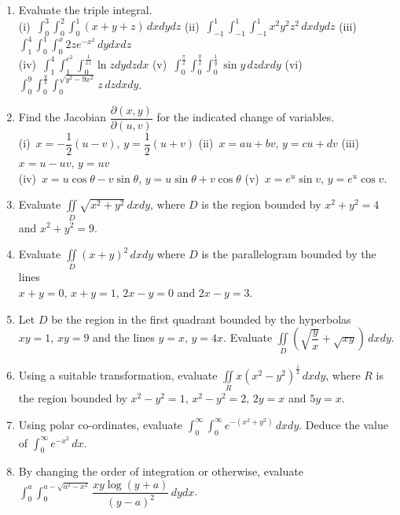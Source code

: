 \documentclass[titlepage,a4paper,12pt]{report}
\begin{document}
\begin{enumerate}
(i)\, $\displaystyle \int _0^1 \int _0^{\sqrt{1-x^2}}\dfrac{dydx}{4-x^2-y^2}$ \quad (ii)\, $\displaystyle \int _0^2\int _0^{\sqrt{4-x^2}}(x^2+y^2)^{\frac{3}{2}}\, dydx$ \quad (iii)\, $\displaystyle \int _0^1\int _0^{\sqrt{1-y^2}}\sin (x^2+y^2)\, dxdy$.
\item Evaluate the triple integral.\\
(i)\, $\displaystyle \int _0^3\int _0^2\int _0^1 (x+y+z)\, dxdydz$ \quad (ii)\, $\displaystyle \int _{-1}^1\int _{-1}^1\int _{-1}^1 x^2y^2z^2\, dxdydz$ \quad (iii)\, $\displaystyle \int _1^4\int _0^1\int _0^x 2ze^{-x^2}\, dydxdz$ \\
(iv)\, $\displaystyle \int _1^4\int _1^{e^2}\int _0^{\frac{1}{xz}} \ln z dydzdx$ \quad (v)\, $\displaystyle \int _0^{\frac{\pi}{2}}\int _0^{\frac{y}{2}}\int _0^{\frac{1}{y}} \sin y \, dzdxdy$ \quad (vi)\, $\displaystyle \int _0^9\int _0^{\frac{y}{3}}\int _0^{\sqrt{y^2-9x^2}}z \, dzdxdy$.
\item Find the Jacobian $\dfrac{\partial (x,y)}{\partial (u,v)}$ for the indicated change of variables.\\
(i)\, $x=-\dfrac{1}{2}(u-v), \, y=\dfrac{1}{2}(u+v)$ \quad (ii)\, $x=au+bv, \, y=cu+dv$ \quad (iii)\, $x=u-uv, \, y=uv$ \\
(iv)\, $x=u\cos \theta-v\sin \theta , \, y=u\sin \theta +v \cos \theta$ \quad (v)\, $x=e^u\sin v ,\, y=e^u\cos v$.
\item Evaluate $\displaystyle \iint \limits _D \sqrt{x^2+y^2}\, dxdy$, where $D$ is the region bounded by $x^2+y^2=4$ and $x^2+y^2=9$.
\item Evaluate $\displaystyle \iint \limits _{D} (x+y)^2\, dxdy$ where $D$ is the parallelogram bounded by the lines \\$x+y=0, \, x+y=1, \, 2x-y=0$ and $2x-y=3$.
\item Let $D$ be the region in the first quadrant bounded by the hyperbolas $xy=1, \, xy=9$ and the lines $y=x, \, y=4x$. Evaluate $\displaystyle \iint \limits _{D}\left(\sqrt{\dfrac{y}{x}}+\sqrt{xy}\right)\, dxdy$.
\item Using a suitable transformation, evaluate $\displaystyle \iint \limits _{R}x(x^2-y^2)^{\frac{1}{2}}\, dxdy$, where $R$ is the region bounded by $x^2-y^2=1, \, x^2-y^2=2, \, 2y=x$ and $5y=x$.
\item Using polar co-ordinates, evaluate $\displaystyle \int _0^{\infty}\int _0^\infty e^{-(x^2+y^2)}\, dxdy$. Deduce the value of $\displaystyle \int _0^\infty e^{-x^2}\, dx$.
\item By changing the order of integration or otherwise, evaluate $\displaystyle \int _0^a\int _0^{a-\sqrt{a^2-x^2}}\dfrac{xy\log (y+a)}{(y-a)^2}\, dydx$.

\end{enumerate}
\end{document}
